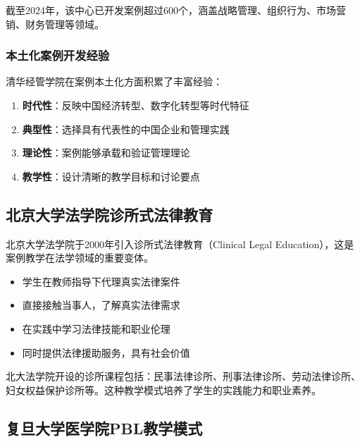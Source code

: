 \documentclass[12pt,a4paper]{ctexart}
\begin{document}
截至2024年，该中心已开发案例超过600个，涵盖战略管理、组织行为、市场营销、财务管理等领域。

\subsubsection{本土化案例开发经验}

清华经管学院在案例本土化方面积累了丰富经验：

\begin{casebox}[清华经管本土化案例开发原则]
\begin{enumerate}[leftmargin=2em]
    \item \textbf{时代性}：反映中国经济转型、数字化转型等时代特征
    \item \textbf{典型性}：选择具有代表性的中国企业和管理实践
    \item \textbf{理论性}：案例能够承载和验证管理理论
    \item \textbf{教学性}：设计清晰的教学目标和讨论要点
\end{enumerate}
\end{casebox}

\subsection{北京大学法学院诊所式法律教育}

北京大学法学院于2000年引入诊所式法律教育（Clinical Legal Education），这是案例教学在法学领域的重要变体。

\begin{keypoint}[诊所式法律教育的特点]
\begin{itemize}[leftmargin=2em]
    \item 学生在教师指导下代理真实法律案件
    \item 直接接触当事人，了解真实法律需求
    \item 在实践中学习法律技能和职业伦理
    \item 同时提供法律援助服务，具有社会价值
\end{itemize}
\end{keypoint}

北大法学院开设的诊所课程包括：民事法律诊所、刑事法律诊所、劳动法律诊所、妇女权益保护诊所等。这种教学模式培养了学生的实践能力和职业素养。

\subsection{复旦大学医学院PBL教学模式}
\end{document}
